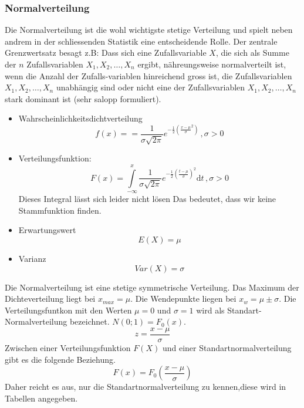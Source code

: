 \subsubsection{Normalverteilung}\label{theorie:normalverteilung}
Die Normalverteilung ist die wohl wichtigste stetige Verteilung und spielt neben andrem in der schliessenden Statistik eine entscheidende Rolle. Der zentrale Grenzwertsatz besagt z.B: Dass sich eine Zufallsvariable $X$, die sich als Summe der $n$ Zufallsvariablen $X_1, X_2, \ldots, X_n$ ergibt, nähreungsweise normalverteilt ist, wenn die Anzahl der Zufalls-variablen hinreichend gross ist, die Zufallsvariablen $X_1, X_2,\ldots , X_n$ unabhängig sind oder nicht eine der Zufallsvariablen $X_1, X_2, \ldots ,X_n$ stark dominant ist (sehr salopp formuliert).
\begin{itemize}
	\item Wahrscheinlichkeitsdichtverteilung
	\begin{equation}
	f(x) == \frac{1}{\sigma\sqrt{2\pi}}e^{-\frac{1}{2}\left(\frac{x-\mu}{\sigma}^{2}\right)}\, , \sigma > 0
	\end{equation}
	\item Verteilungsfunktion:
	\begin{equation}
	F(x) = \int\limits_{-\infty}^{x}\frac{1}{\sigma\sqrt{2\pi}}e^{-\frac{1}{2}\left(\frac{t-\mu}{\sigma}\right)^2}\mathrm{d}t\, ,\sigma > 0
	\end{equation}
	Dieses Integral lässt sich leider nicht lösen Das bedeutet, dass wir keine Stammfunktion finden.
	\item Erwartungswert
	\begin{equation}
	E(X) = \mu
	\end{equation}
	\item Varianz
	\begin{equation}
	Var(X) = \sigma
	\end{equation}
\end{itemize}
Die Normalverteilung ist eine stetige symmetrische Verteilung. Das Maximum der Dichteverteilung liegt bei $x_{max}=\mu$. Die Wendepunkte liegen bei $x_w=\mu\pm\sigma$. Die Verteilungsfuntkon mit den Werten $\mu=0$ und $\sigma=1$ wird als Standart-Normalverteilung bezeichnet. $N(0;1)=F_0(x)$.
\begin{equation}
z=\frac{x-\mu}{\sigma}
\end{equation}
Zwischen einer Verteilungsfunktion $F(X)$ und einer Standartnormalverteilung gibt es die folgende Beziehung.
\begin{equation}
F(x)=F_0\left(\frac{x-\mu}{\sigma}\right)
\end{equation}
Daher reicht es aus, nur die Standartnormalverteilung zu kennen,diese wird in Tabellen angegeben.
